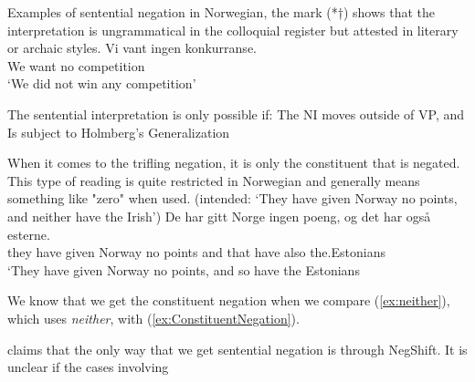 \documentclass[12pt, letterpaper]{article}
\begin{document}
\ex Examples of sentential negation in Norwegian, the mark (*†) shows that the interpretation is ungrammatical in the colloquial register but attested in literary or archaic styles.
	\ea 
	\gll Vi vant ingen konkurranse.\\
	We want no competition\\
	\trans `We did not win any competition'
	\z  

\ex The sentential interpretation is only possible if:
	\ea The NI moves outside of VP, and
	\ex Is subject to Holmberg's Generalization
	\z 


\ex When it comes to the trifling negation, it is only the constituent that is negated. This type of reading is quite restricted in Norwegian and generally means something like "zero" when used. 
	\trans (intended: `They have given Norway no points, and neither have the Irish') \label{ex:neither}
	\ex 
	\gll De har gitt Norge ingen poeng, og det har også esterne.\\
	they have given Norway no points and that have also the.Estonians\\
	\trans ‘They have given Norway no points, and so have the Estonians \label{ex:ConstituentNegation}
	\z 
	
\ex We know that we get the constituent negation when we compare (\ref{ex:neither}), which uses \emph{neither}, with (\ref{ex:ConstituentNegation}).

\ex \citeauthor{svenoniusStrainsNegationNorwegian2002} claims that the only way that we get sentential negation is through NegShift.
	\ea It is unclear if the cases involving 
	\z 

\z
\end{document}
